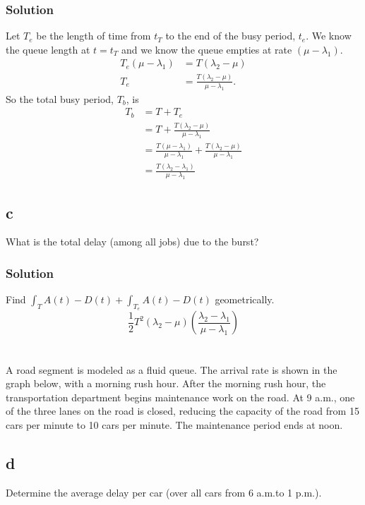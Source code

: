 \documentclass[letterpaper]{amsart}
\begin{document}
\subsubsection*{Solution}
Let $T_e$ be the length of time from $t_T$ to the end of the busy period, $t_e$. We know the
queue length at $t=t_T$ and we know the queue empties at rate $(\mu-\lambda_1)$.
\begin{align*}
  T_e(\mu - \lambda_1) &= T(\lambda_2 - \mu) \\
  T_e &= \frac{T(\lambda_2 - \mu)}{\mu - \lambda_1}.
\end{align*}
So the total busy period, $T_b$, is
\begin{align*}
  T_b &= T + T_e \\
  &= T + \frac{T(\lambda_2 - \mu)}{\mu-\lambda_1} \\
      &= \frac{T(\mu-\lambda_1)}{\mu-\lambda_1} + \frac{T(\lambda_2 - \mu)}{\mu-\lambda_1} \\
  &=\frac{T(\lambda_2-\lambda_1)}{\mu-\lambda_1}
\end{align*}

\subsection*{c}
What is the total delay (among all jobs) due to the burst?

\subsubsection*{Solution}
Find $\int_TA(t)-D(t)+\int_{T_e}A(t)-D(t)$ geometrically.
\begin{equation*}
  \frac{1}{2}T^2(\lambda_2-\mu)\left( \frac{\lambda_2-\lambda_1}{\mu-\lambda_1} \right)
\end{equation*}

\section{} %
A road segment is modeled as a fluid queue. The arrival rate is shown in the graph below,
with a morning rush hour. After the morning rush hour, the transportation department
begins maintenance work on the road. At 9 a.m., one of the three lanes on the road is
closed, reducing the capacity of the road from 15 cars per minute to 10 cars per minute.
The maintenance period ends at noon.
\subsection*{d}
Determine the average delay per car (over all cars from 6 a.m.to 1 p.m.).
\end{document}
